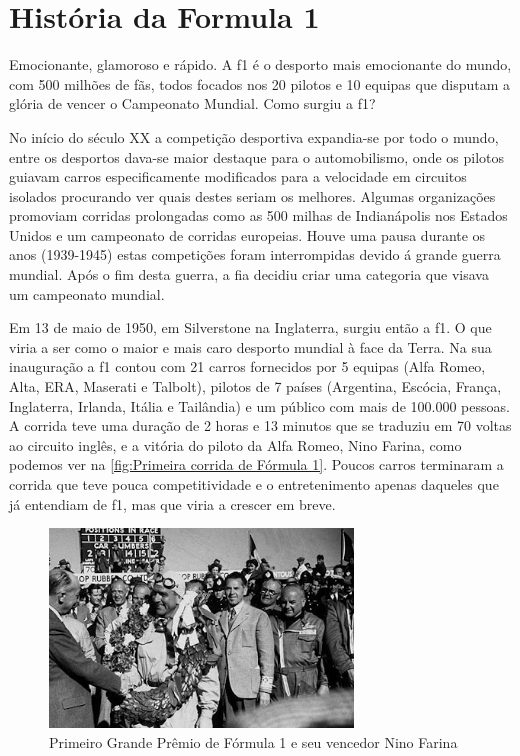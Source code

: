 \documentclass{report}
\begin{document}
\chapter{História da Formula 1}
Emocionante, glamoroso e rápido. A \ac{f1} é o desporto mais emocionante 
do mundo, com 500 milhões de fãs, todos focados nos 20 pilotos e 10 equipas que disputam a glória de vencer o Campeonato Mundial.
Como surgiu a \ac{f1}?


No início do século XX a competição desportiva expandia-se por todo o mundo, entre os desportos dava-se maior destaque para o automobilismo, onde os pilotos guiavam carros especificamente modificados para a velocidade em circuitos isolados procurando ver quais destes seriam os melhores. Algumas organizações promoviam corridas prolongadas como as 500 milhas de Indianápolis nos Estados Unidos e um campeonato de corridas europeias. 
Houve uma pausa durante os anos (1939-1945) estas competições foram interrompidas devido á grande guerra mundial. Após o fim desta guerra, a \ac{fia} decidiu criar uma categoria que visava um campeonato mundial.


Em 13 de maio de 1950, em Silverstone na Inglaterra, surgiu então a \ac{f1}. O que viria a ser como o maior e mais caro desporto mundial à face da Terra. Na sua inauguração a \ac{f1} contou com 21 carros fornecidos por 5 equipas (Alfa Romeo, Alta, ERA, Maserati e Talbolt), pilotos de 7 países (Argentina, Escócia, França, Inglaterra, Irlanda, Itália e Tailândia) e um público com mais de 100.000 pessoas. A corrida teve uma duração de 2 horas e 13 minutos que se traduziu em 70 voltas ao circuito inglês, e a vitória do piloto da Alfa Romeo, Nino Farina, como podemos ver na \autoref{fig:Primeira corrida de Fórmula 1}. Poucos carros terminaram a corrida que teve pouca competitividade e o entretenimento apenas daqueles que já entendiam de \ac{f1}, mas que viria a crescer em breve.\\[2cm]
\begin{figure}[h]
\center %
\includegraphics[height=150pt]{Primeira corrida de Formula 1}
\caption{Primeiro Grande Prêmio de Fórmula 1 e seu vencedor Nino Farina}
\label{fig:Primeira corrida de Formula 1}
\end{figure}
 
\end{document}
